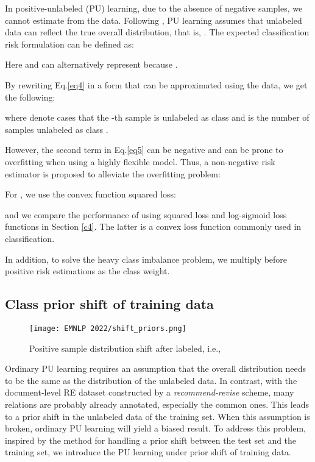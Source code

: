 \documentclass[11pt]{article}
\begin{document}
In positive-unlabeled (PU) learning, due to the absence of negative samples, we cannot  estimate  from the data. Following \citep{NIPS2014_35051070}, PU learning assumes that unlabeled data can reflect the true overall distribution, that is, . The expected classification risk formulation can be defined as:

Here  and   can alternatively represent  because .

By rewriting Eq.\ref{eq4} in a form that can be approximated using the data, we get the following:

where  denote cases that the -th sample is unlabeled as class  and  is the number of samples unlabeled as class .

However, the second term in Eq.\ref{eq5} can be negative and can be prone to overfitting when using a highly flexible model. Thus, a non-negative risk estimator \citep{NIPS2017_7cce53cf} is proposed to alleviate the overfitting problem:


For , we use the convex function squared loss:

and we compare the performance of using squared loss and log-sigmoid loss functions in Section \ref{c4}. The latter is a convex loss function commonly used in classification.

In addition, to solve the heavy class imbalance problem, we multiply  before positive risk estimations as the class weight.

\subsection{Class prior shift of training data}
\begin{figure}
\centering
\texttt{[image: EMNLP 2022/shift\_priors.png]} 
\caption{Positive sample distribution shift after labeled, i.e., }
\label{fig2}
\end{figure}
Ordinary PU learning requires an assumption that the overall distribution needs to be the same as the distribution of the unlabeled data. In contrast, with the document-level RE dataset constructed by a \emph{recommend-revise} scheme, many relations are probably already annotated, especially the common ones. This leads to a prior shift in the unlabeled data of the training set. When this assumption is broken, ordinary PU learning will yield a biased result. To address this problem, inspired by the method \citep{charoenphakdee2019positive} for handling a prior shift between the test set and the training set, we introduce the PU learning under prior shift of training data.
\end{document}
